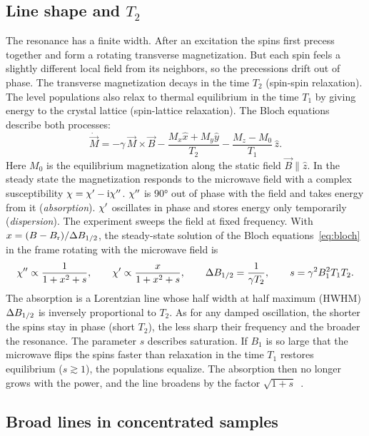 \subsection{Line shape and \texorpdfstring{$T_2$}{T2}}\label{sec:lineshape}

The resonance has a finite width. After an excitation the spins first precess together and form a
rotating transverse magnetization. But each spin feels a slightly different local field from its neighbors, so the
precessions drift out of phase. The transverse magnetization decays in the time $T_2$ (spin-spin relaxation). The
level populations also relax to thermal equilibrium in the time $T_1$ by giving energy to the crystal
lattice (spin-lattice relaxation). The Bloch equations~\cite{bloch1946} describe both processes:
\begin{equation}\label{eq:bloch}
  \dot{\vec M}=-\gamma\,\vec M\times\vec B-\frac{M_x\hat x+M_y\hat y}{T_2}-\frac{M_z-M_0}{T_1}\,\hat z .
\end{equation}
Here $M_0$ is the equilibrium magnetization along the static field $\vec B\parallel\hat z$.
In the steady state the magnetization responds to the microwave field with a complex susceptibility
$\chi=\chi'-\mathrm{i}\chi''$. $\chi''$ is \ang{90} out of phase with the field and takes energy from it
(\emph{absorption}). $\chi'$ oscillates in phase and stores energy only temporarily (\emph{dispersion}). The
experiment sweeps the field at fixed frequency. With $x=(B-B_\mathrm{r})/\Delta B_{1/2}$, the steady-state solution of the Bloch
equations~\eqref{eq:bloch} in the frame rotating with the microwave field is~\cite{abragam1961,slichter1990}
\begin{equation}\label{eq:chi}
  \chi''\propto\frac{1}{1+x^2+s},\qquad \chi'\propto\frac{x}{1+x^2+s},\qquad
  \Delta B_{1/2}=\frac{1}{\gamma T_2},\qquad s=\gamma^2B_1^2T_1T_2 .
\end{equation}
The absorption is a Lorentzian line whose half width at half maximum (HWHM) $\Delta B_{1/2}$ is inversely proportional to $T_2$.
As for any damped oscillation, the shorter the spins stay in phase (short $T_2$), the less sharp their frequency and
the broader the resonance.
The parameter $s$ describes saturation. If $B_1$ is so large that the microwave flips the spins faster than
relaxation in the time $T_1$ restores equilibrium ($s\gtrsim1$), the populations equalize. The absorption then no
longer grows with the power, and the line broadens by the factor $\sqrt{1+s}$~\cite{abragam1961,poole1996}.

\subsection{Broad lines in concentrated samples}\label{sec:width}

